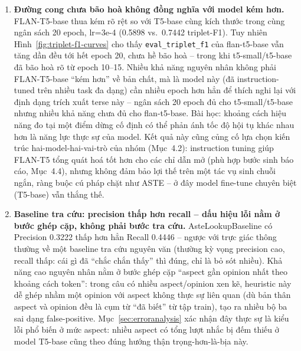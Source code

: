 \documentclass[11pt,a4paper]{article}
\begin{document}
\begin{enumerate}
    \item \textbf{Đường cong chưa bão hoà không đồng nghĩa với model kém
        hơn.} FLAN-T5-base thua kém rõ rệt so với T5-base cùng kích thước
        trong cùng ngân sách 20 epoch, lr=3e-4 (0.5898 vs.\ 0.7442
        triplet-F1). Tuy nhiên Hình~\ref{fig:triplet-f1-curves} cho thấy
        \texttt{eval\_triplet\_f1} của flan-t5-base vẫn tăng dần đều tới
        hết epoch 20, chưa hề bão hoà -- trong khi t5-small/t5-base đã
        bão hoà rõ từ epoch 10--15. Nhiều khả năng nguyên nhân không phải
        FLAN-T5-base ``kém hơn'' về bản chất, mà là model này (đã
        instruction-tuned trên nhiều task đa dạng) cần nhiều epoch hơn
        hẳn để thích nghi lại với định dạng trích xuất terse này -- ngân
        sách 20 epoch đủ cho t5-small/t5-base nhưng nhiều khả năng chưa
        đủ cho flan-t5-base. Bài học: khoảng cách hiệu năng đo tại một
        điểm dừng cố định có thể phản ánh tốc độ hội tụ khác nhau hơn là
        năng lực thực sự của model. Kết quả này cũng củng cố lựa chọn
        kiến trúc hai-model-hai-vai-trò của nhóm (Mục~4.2): instruction
        tuning giúp FLAN-T5 tổng quát hoá tốt hơn cho các chỉ dẫn mở
        (phù hợp bước sinh báo cáo, Mục~4.4), nhưng không đảm bảo lợi thế
        trên một tác vụ sinh chuỗi ngắn, ràng buộc cú pháp chặt như ASTE
        -- ở đây model fine-tune chuyên biệt (T5-base) vẫn thắng thế.

    \item \textbf{Baseline tra cứu: precision thấp hơn recall -- dấu
        hiệu lỗi nằm ở bước ghép cặp, không phải bước tra cứu.}
        AsteLookupBaseline có Precision 0.3222 thấp hơn hẳn Recall
        0.4446 -- ngược với trực giác thông thường về một baseline tra
        cứu nguyên văn (thường kỳ vọng precision cao, recall thấp: cái
        gì đã ``chắc chắn thấy'' thì đúng, chỉ là bỏ sót nhiều). Khả năng
        cao nguyên nhân nằm ở bước ghép cặp ``aspect gần opinion nhất
        theo khoảng cách token'': trong câu có nhiều aspect/opinion xen
        kẽ, heuristic này dễ ghép nhầm một opinion với aspect không thực
        sự liên quan (dù bản thân aspect và opinion đều là cụm từ ``đã
        biết'' từ tập train), tạo ra nhiều bộ ba sai dạng false-positive.
        Mục~\ref{sec:erroranalysis} xác nhận đây thực sự là kiểu lỗi phổ
        biến ở mức aspect: nhiều aspect có tổng lượt nhắc bị đếm thiếu ở
        model T5-base cũng theo đúng hướng thận trọng-hơn-là-bịa này.
\end{enumerate}
\end{document}
